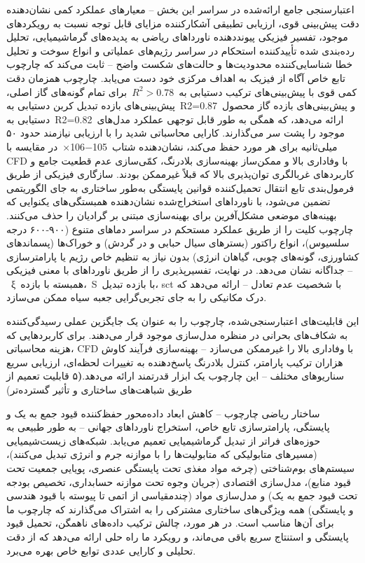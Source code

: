\documentclass[12pt, a4paper]{article}
\begin{document}
اعتبارسنجی جامع ارائه‌شده در سراسر این بخش – معیارهای عملکرد کمی نشان‌دهنده دقت پیش‌بینی قوی، ارزیابی تطبیقی آشکارکننده مزایای قابل توجه نسبت به رویکردهای موجود، تفسیر فیزیکی پیونددهنده ناورداهای ریاضی به پدیده‌های گرماشیمیایی، تحلیل رده‌بندی شده تأییدکننده استحکام در سراسر رژیم‌های عملیاتی و انواع سوخت و تحلیل خطا شناسایی‌کننده محدودیت‌ها و حالت‌های شکست واضح – ثابت می‌کند که چارچوب تابع خاص آگاه از فیزیک به اهداف مرکزی خود دست می‌یابد. چارچوب همزمان دقت کمی قوی با پیش‌بینی‌های ترکیب دستیابی به $R^{2}>0.78$ برای تمام گونه‌های گاز اصلی، پیش‌بینی‌های بازده تبدیل کربن دستیابی به R2=0.87 و پیش‌بینی‌های بازده گاز محصول دستیابی به R2=0.82 ارائه می‌دهد، که همگی به طور قابل توجهی عملکرد مدل‌های موجود را پشت سر می‌گذارند. کارایی محاسباتی شدید را با ارزیابی نیازمند حدود ۵۰ میلی‌ثانیه برای هر مورد حفظ می‌کند، نشان‌دهنده شتاب 105−106× در مقایسه با CFD با وفاداری بالا و ممکن‌ساز بهینه‌سازی بلادرنگ، کمّی‌سازی عدم قطعیت جامع و کاربردهای غربالگری توان‌پذیری بالا که قبلاً غیرممکن بودند. سازگاری فیزیکی از طریق فرمول‌بندی تابع انتقال تحمیل‌کننده قوانین پایستگی به‌طور ساختاری به جای الگوریتمی تضمین می‌شود، با ناورداهای استخراج‌شده نشان‌دهنده همبستگی‌های یکنوایی که بهینه‌های موضعی مشکل‌آفرین برای بهینه‌سازی مبتنی بر گرادیان را حذف می‌کنند. چارچوب کلیت را از طریق عملکرد مستحکم در سراسر دماهای متنوع (۹۰۰-۶۰۰ درجه سلسیوس)، انواع راکتور (بسترهای سیال حبابی و در گردش) و خوراک‌ها (پسماندهای کشاورزی، گونه‌های چوبی، گیاهان انرژی) بدون نیاز به تنظیم خاص رژیم یا پارامترسازی جداگانه نشان می‌دهد. در نهایت، تفسیرپذیری را از طریق ناورداهای با معنی فیزیکی – ξ همبسته با بازده، S با بازده تبدیل، sct با شخصیت عدم تعادل – ارائه می‌دهد که درک مکانیکی را به جای تجربی‌گرایی جعبه سیاه ممکن می‌سازد.

این قابلیت‌های اعتبارسنجی‌شده، چارچوب را به عنوان یک جایگزین عملی رسیدگی‌کننده به شکاف‌های بحرانی در منظره مدل‌سازی موجود قرار می‌دهند. برای کاربردهایی که هزینه محاسباتی، CFD با وفاداری بالا را غیرممکن می‌سازد – بهینه‌سازی فرآیند کاوش هزاران ترکیب پارامتر، کنترل بلادرنگ پاسخ‌دهنده به تغییرات لحظه‌ای، ارزیابی سریع سناریوهای مختلف – این چارچوب یک ابزار قدرتمند ارائه می‌دهد.\textbf(۵ قابلیت تعمیم از طریق شباهت‌های ساختاری و تأثیر گسترده‌تر)

ساختار ریاضی چارچوب – کاهش ابعاد داده‌محور حفظ‌کننده قیود جمع به یک و پایستگی، پارامترسازی تابع خاص، استخراج ناورداهای جهانی – به طور طبیعی به حوزه‌های فراتر از تبدیل گرماشیمیایی تعمیم می‌یابد. شبکه‌های زیست‌شیمیایی (مسیرهای متابولیکی که متابولیت‌ها را با موازنه جرم و انرژی تبدیل می‌کنند)، سیستم‌های بوم‌شناختی (چرخه مواد مغذی تحت پایستگی عنصری، پویایی جمعیت تحت قیود منابع)، مدل‌سازی اقتصادی (جریان وجوه تحت موازنه حسابداری، تخصیص بودجه تحت قیود جمع به یک) و مدل‌سازی مواد (چندمقیاسی از اتمی تا پیوسته با قیود هندسی و پایستگی) همه ویژگی‌های ساختاری مشترکی را به اشتراک می‌گذارند که چارچوب ما برای آن‌ها مناسب است. در هر مورد، چالش ترکیب داده‌های ناهمگن، تحمیل قیود پایستگی و استنتاج سریع باقی می‌ماند، و رویکرد ما راه حلی ارائه می‌دهد که از دقت تحلیلی و کارایی عددی توابع خاص بهره می‌برد.
\end{document}
